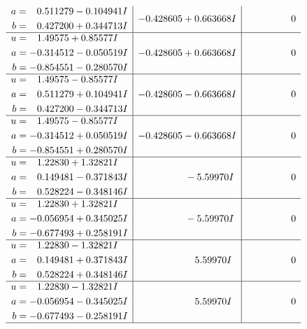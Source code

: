 \documentclass[1p]{elsarticle_modified}
\theoremstyle{definition}
\begin{document}
$$\begin{array}{c|c|c}
\begin{aligned}
a &= \phantom{-}0.511279 - 0.104941 I \\
b &= \phantom{-}0.427200 + 0.344713 I\end{aligned}
 & -0.428605 + 0.663668 I & \phantom{-0.000000 } 0 \\ \hline\begin{aligned}
u &= \phantom{-}1.49575 + 0.85577 I \\
a &= -0.314512 - 0.050519 I \\
b &= -0.854551 - 0.280570 I\end{aligned}
 & -0.428605 + 0.663668 I & \phantom{-0.000000 } 0 \\ \hline\begin{aligned}
u &= \phantom{-}1.49575 - 0.85577 I \\
a &= \phantom{-}0.511279 + 0.104941 I \\
b &= \phantom{-}0.427200 - 0.344713 I\end{aligned}
 & -0.428605 - 0.663668 I & \phantom{-0.000000 } 0 \\ \hline\begin{aligned}
u &= \phantom{-}1.49575 - 0.85577 I \\
a &= -0.314512 + 0.050519 I \\
b &= -0.854551 + 0.280570 I\end{aligned}
 & -0.428605 - 0.663668 I & \phantom{-0.000000 } 0 \\ \hline\begin{aligned}
u &= \phantom{-}1.22830 + 1.32821 I \\
a &= \phantom{-}0.149481 - 0.371843 I \\
b &= \phantom{-}0.528224 - 0.348146 I\end{aligned}
 & \phantom{-0.000000 } -5.59970 I & \phantom{-0.000000 } 0 \\ \hline\begin{aligned}
u &= \phantom{-}1.22830 + 1.32821 I \\
a &= -0.056954 + 0.345025 I \\
b &= -0.677493 + 0.258191 I\end{aligned}
 & \phantom{-0.000000 } -5.59970 I & \phantom{-0.000000 } 0 \\ \hline\begin{aligned}
u &= \phantom{-}1.22830 - 1.32821 I \\
a &= \phantom{-}0.149481 + 0.371843 I \\
b &= \phantom{-}0.528224 + 0.348146 I\end{aligned}
 & \phantom{-0.000000 -}5.59970 I & \phantom{-0.000000 } 0 \\ \hline\begin{aligned}
u &= \phantom{-}1.22830 - 1.32821 I \\
a &= -0.056954 - 0.345025 I \\
b &= -0.677493 - 0.258191 I\end{aligned}
 & \phantom{-0.000000 -}5.59970 I & \phantom{-0.000000 } 0\\
 \hline 
 \end{array}$$\newpage\newpage\renewcommand{\arraystretch}{1}
\end{document}

